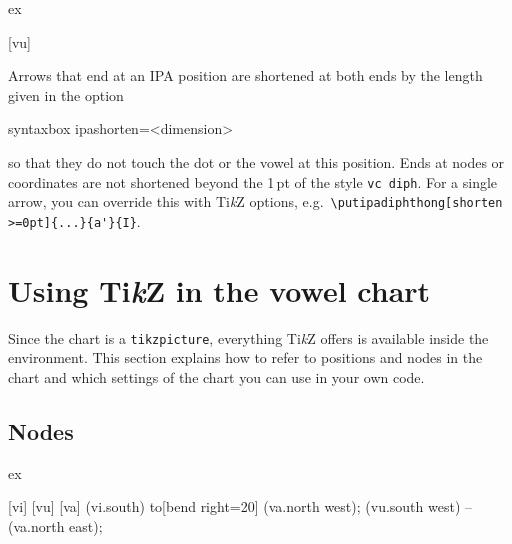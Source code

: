 \documentclass[a4paper,11pt]{article}
\begin{document}
\begin{tcblisting}{ex}
\begin{vowelchart}[width=5cm]
  [vu]
\end{vowelchart}
\end{tcblisting}

\noindent
Arrows that end at an IPA position are shortened at both ends by the length given in the option

\begin{tcblisting}{syntaxbox}
ipashorten=<dimension>          %
\end{tcblisting}

\noindent
so that they do not touch the dot or the vowel at this position. Ends at nodes or coordinates are not shortened beyond the 1\,pt of the style \texttt{vc diph}. For a single arrow, you can override this with Ti\textit{k}Z options, e.g.\ \verb|\putipadiphthong[shorten >=0pt]{...}{a'}{I}|.





\section{Using Ti\textit{k}Z in the vowel chart} \label{sec:TikZ}

Since the chart is a \texttt{tikzpicture}, everything Ti\textit{k}Z offers is available inside the environment. This section explains how to refer to positions and nodes in the chart and which settings of the chart you can use in your own code.

\subsection{Nodes}\label{sec:nodes}

\begin{tcblisting}{ex}
\begin{vowelchart}[slanted, width=5cm]
  [vi]
  [vu]
  [va]
    (vi.south) to[bend right=20] (va.north west);
   (vu.south west) -- (va.north east);
\end{vowelchart}
\end{tcblisting}
\end{document}
